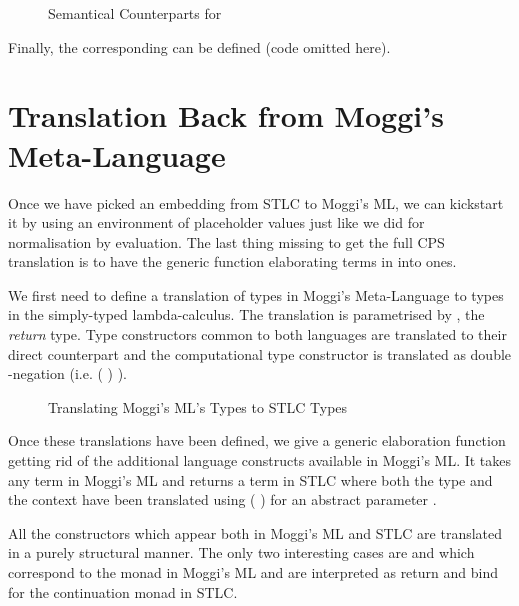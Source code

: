 \begin{figure}[h]
\caption{Semantical Counterparts for \label{fig:cbvelim}}
\end{figure}

Finally, the corresponding  can be defined (code omitted here).

\section{Translation Back from Moggi's Meta-Language}

Once we have picked an embedding from STLC to Moggi's ML, we can kickstart it by using
an environment of placeholder values just like we did for normalisation by evaluation.
The last thing missing to get the full CPS translation is to have the generic function
elaborating terms in  into  ones.

We first need to define a translation of types in Moggi's Meta-Language to types in
the simply-typed lambda-calculus. The translation is parametrised by , the
\emph{return} type. Type constructors common to both languages are translated to their
direct counterpart and the computational type constructor is translated as double
-negation (i.e. (\AB{\ensuremath{\cdot{}}}  )  ).

\begin{figure}[h]
\caption{Translating Moggi's ML's Types to STLC Types\label{fig:cpstypeml}}
\end{figure}

Once these translations have been defined, we give a generic elaboration function
getting rid of the additional language constructs available in Moggi's ML. It
takes any term in Moggi's ML and returns a term in STLC where both the type and
the context have been translated using (\AF{CPS[}  \AF{]}) for an abstract
parameter .


All the constructors which appear both in Moggi's ML and STLC are translated
in a purely structural manner. The only two interesting cases are 
and  which correspond to the \AIC{\#} monad in Moggi's ML and are
interpreted as return and bind for the continuation monad in STLC.

